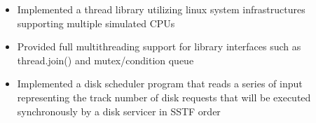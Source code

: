 \documentclass{resume}
\begin{document}
\begin{itemize}
\item Implemented a thread library utilizing linux system infrastructures supporting multiple simulated CPUs
\item Provided full multithreading support for library interfaces such as thread.join() and mutex/condition queue
\item Implemented a disk scheduler program that reads a series of input representing the track number of disk requests that will be executed synchronously by a disk servicer in SSTF order
\end{itemize}

%
%
\end{document}
